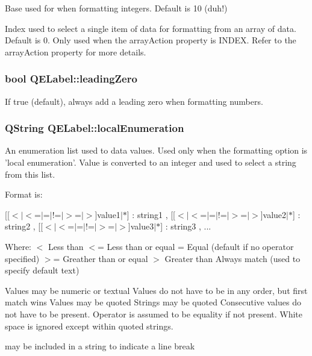 Base used for when formatting integers. Default is 10 (duh!)

Index used to select a single item of data for formatting from an array of data. Default is 0. Only used when the arrayAction property is INDEX. Refer to the arrayAction property for more details. \hypertarget{classQELabel_ab81959e3e708ca9e8be50e3b1e6a43e5}{
\subsubsection[{leadingZero}]{\setlength{\rightskip}{0pt plus 5cm}bool QELabel::leadingZero}}
\label{classQELabel_ab81959e3e708ca9e8be50e3b1e6a43e5}
If true (default), always add a leading zero when formatting numbers. \hypertarget{classQELabel_aae33395c63123b2e78a15d054b619d18}{
\subsubsection[{localEnumeration}]{\setlength{\rightskip}{0pt plus 5cm}QString QELabel::localEnumeration}}
\label{classQELabel_aae33395c63123b2e78a15d054b619d18}
An enumeration list used to data values. Used only when the formatting option is 'local enumeration'. Value is converted to an integer and used to select a string from this list.

Format is:

\mbox{[}\mbox{[}$<$$|$$<$=$|$=$|$!=$|$$>$=$|$$>$\mbox{]}value1$|$$\ast$\mbox{]} : string1 , \mbox{[}\mbox{[}$<$$|$$<$=$|$=$|$!=$|$$>$=$|$$>$\mbox{]}value2$|$$\ast$\mbox{]} : string2 , \mbox{[}\mbox{[}$<$$|$$<$=$|$=$|$!=$|$$>$=$|$$>$\mbox{]}value3$|$$\ast$\mbox{]} : string3 , ...

Where: $<$ Less than $<$= Less than or equal = Equal (default if no operator specified) $>$= Greather than or equal $>$ Greater than Always match (used to specify default text)

Values may be numeric or textual Values do not have to be in any order, but first match wins Values may be quoted Strings may be quoted Consecutive values do not have to be present. Operator is assumed to be equality if not present. White space is ignored except within quoted strings. \par
 may be included in a string to indicate a line break

